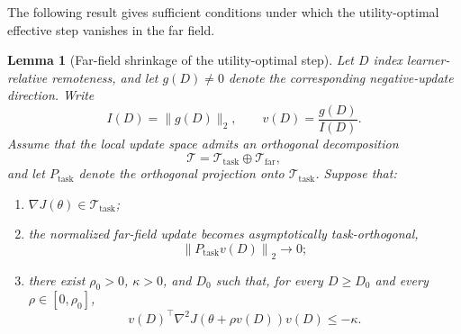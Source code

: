 \documentclass{article}
\theoremstyle{plain}
\newtheorem{lemma}[theorem]{Lemma}
\theoremstyle{definition}
\theoremstyle{remark}
\begin{document}
The following result gives sufficient conditions under which the
utility-optimal effective step vanishes in the far field.

\begin{lemma}[Far-field shrinkage of the utility-optimal step]
\label{lem:far_field_utility}
Let \(D\) index learner-relative remoteness, and let \(g(D)\neq0\)
denote the corresponding negative-update direction. Write
\begin{equation}
    I(D)
    =
    \|g(D)\|_2,
    \qquad
    v(D)
    =
    \frac{g(D)}{I(D)}.
    \label{eq:far_field_direction}
\end{equation}
Assume that the local update space admits an orthogonal decomposition
\begin{equation}
    \mathcal T
    =
    \mathcal T_{\mathrm{task}}
    \oplus
    \mathcal T_{\mathrm{far}},
    \label{eq:task_far_decomposition}
\end{equation}
and let \(P_{\mathrm{task}}\) denote the orthogonal projection onto
\(\mathcal T_{\mathrm{task}}\). Suppose that:
\begin{enumerate}
    \item \(\nabla J(\theta)\in\mathcal T_{\mathrm{task}}\);

    \item the normalized far-field update becomes asymptotically
    task-orthogonal,
    \begin{equation}
        \left\|
            P_{\mathrm{task}}v(D)
        \right\|_2
        \longrightarrow 0;
        \label{eq:task_projection_vanishes}
    \end{equation}

    \item there exist \(\rho_0>0\), \(\kappa>0\), and \(D_0\) such that,
    for every \(D\geq D_0\) and every \(\rho\in[0,\rho_0]\),
    \begin{equation}
        v(D)^\top
        \nabla^2J
        \!\left(
            \theta+\rho v(D)
        \right)
        v(D)
        \leq
        -\kappa.
        \label{eq:far_field_negative_curvature}
    \end{equation}
\end{enumerate}


\end{lemma}
\end{document}
